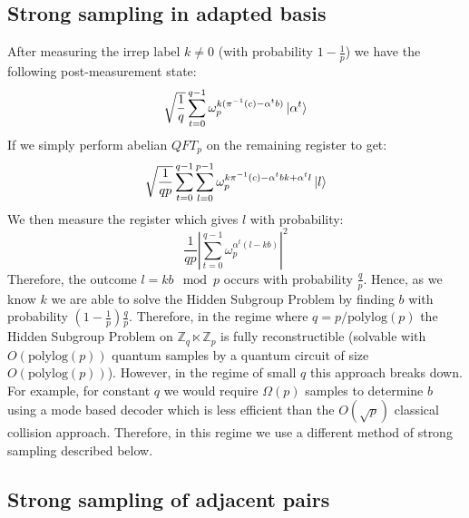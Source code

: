 \documentclass[aps,floatfix,10pt,amssymb,amsfont,amsmath,superscriptaddress,float,nofootinbib,longbibliography,nobalancelastpage,twocolumn]{revtex4-2}
\begin{document}
\subsection{Strong sampling in adapted basis}
After measuring the irrep label $k \neq 0$ (with probability $1-\frac{1}{p}$) we have the following post-measurement state:
\begin{equation}
    \sqrt{\frac{1}{q}}\sum_{t=0}^{q-1} \omega_p^{k (\pi^{-1}(c) - \alpha^tb)}\ket{\alpha^t}
\end{equation}
If we simply perform abelian $QFT_p$ on the remaining register to get:
\begin{equation}
    \sqrt{\frac{1}{qp}}\sum_{t=0}^{q-1}\sum_{l=0}^{p-1} \omega_p^{k \pi^{-1}(c) - \alpha^tbk + \alpha^t l}\ket{l}
\end{equation}
We then measure the register which gives $l$ with probability:
\begin{equation}
    \frac{1}{qp}\left|\sum_{t=0}^{q-1} \omega_p^{ \alpha^t(l-kb)}\right|^2
\end{equation}
Therefore, the outcome $l=kb \mod p$ occurs with probability $\frac{q}{p}$. Hence, as we know $k$ we are able to solve the Hidden Subgroup Problem by finding $b$ with probability $(1-\frac{1}{p})\frac{q}{p}$. Therefore, in the regime where $q = p/\text{polylog}(p)$ the Hidden Subgroup Problem on $\mathbb{Z}_q \ltimes \mathbb{Z}_p$ is fully reconstructible (solvable with $O(\text{polylog} (p))$ quantum samples by a quantum circuit of size $O(\text{polylog} (p))$).  However, in the regime of small $q$ this approach breaks down. For example, for constant $q$ we would require $\Omega(p)$ samples to determine $b$ using a mode based decoder which is less efficient than the $O(\sqrt{p})$ classical collision approach. Therefore, in this regime we use a different method of strong sampling described below.

\subsection{Strong sampling of adjacent pairs}
\label{section:pairs}
\end{document}
